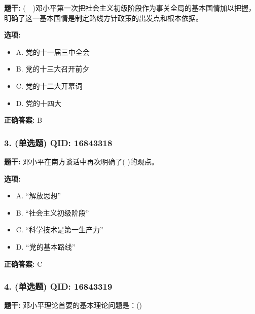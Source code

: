 \documentclass[12pt,UTF8]{ctexart}
\begin{document}
\textbf{题干:}
(  )邓小平第一次把社会主义初级阶段作为事关全局的基本国情加以把握，明确了这一基本国情是制定路线方针政策的出发点和根本依据。

\textbf{选项:}
\begin{itemize}[leftmargin=*]

  \item A. 党的十一届三中全会

  \item B. 党的十三大召开前夕

  \item C. 党的十二大开幕词

  \item D. 党的十四大

\end{itemize}

\textbf{正确答案:}
B

\vspace{0.3em}\hrulefill\vspace{0.7em}

\subsubsection*{3. (单选题) \small QID: 16843318}

\textbf{题干:}
邓小平在南方谈话中再次明确了( )的观点。

\textbf{选项:}
\begin{itemize}[leftmargin=*]

  \item A. “解放思想”

  \item B. “社会主义初级阶段”

  \item C. “科学技术是第一生产力”

  \item D. “党的基本路线”

\end{itemize}

\textbf{正确答案:}
C

\vspace{0.3em}\hrulefill\vspace{0.7em}

\subsubsection*{4. (单选题) \small QID: 16843319}

\textbf{题干:}
邓小平理论首要的基本理论问题是：()
\end{document}
